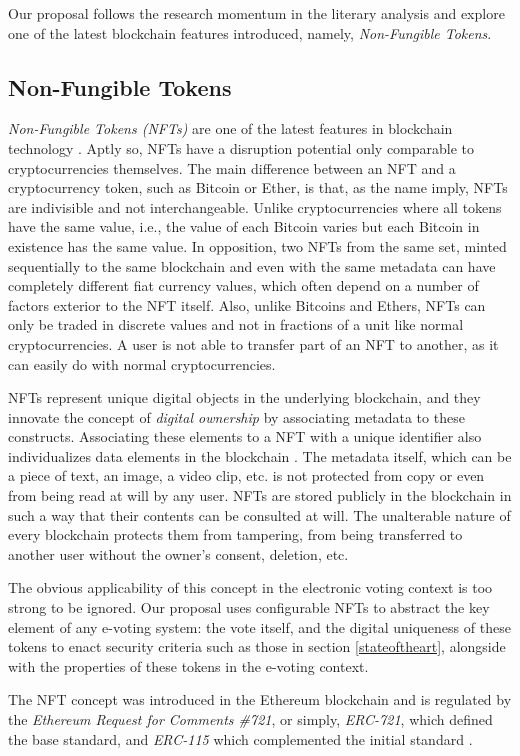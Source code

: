 Our proposal follows the research momentum in the literary analysis and explore one of the latest blockchain features introduced, namely, \textit{Non-Fungible Tokens}.

\subsection{Non-Fungible Tokens}
\textit{Non-Fungible Tokens (NFTs)} are one of the latest features in blockchain technology \cite{Valeonti2021}. Aptly so, NFTs have a disruption potential only comparable to cryptocurrencies themselves. The main difference between an NFT and a cryptocurrency token, such as Bitcoin or Ether, is that, as the name imply, NFTs are indivisible and not interchangeable. Unlike cryptocurrencies where all tokens have the same value, i.e., the value of each Bitcoin varies but each Bitcoin in existence has the same value. In opposition, two NFTs from the same set, minted sequentially to the same blockchain and even with the same metadata can have completely different fiat currency values, which often depend on a number of factors exterior to the NFT itself. Also, unlike Bitcoins and Ethers, NFTs can only be traded in discrete values and not in fractions of a unit like normal cryptocurrencies. A user is not able to transfer part of an NFT to another, as it can easily do with normal cryptocurrencies.
\par
NFTs represent unique digital objects in the underlying blockchain, and they innovate the concept of \textit{digital ownership} by associating metadata to these constructs. Associating these elements to a NFT with a unique identifier also individualizes data elements in the blockchain \cite{Fairfield2021}. The metadata itself, which can be a piece of text, an image, a video clip, etc. is not protected from copy or even from being read at will by any user. NFTs are stored publicly in the blockchain in such a way that their contents can be consulted at will. The unalterable nature of every blockchain protects them from tampering, from being transferred to another user without the owner's consent, deletion, etc.
\par
The obvious applicability of this concept in the electronic voting context is too strong to be ignored. Our proposal uses configurable NFTs to abstract the key element of any e-voting system: the vote itself, and the digital uniqueness of these tokens to enact security criteria such as those in section \ref{stateoftheart}, alongside with the properties of these tokens in the e-voting context.
\par
The NFT concept was introduced in the Ethereum blockchain and is regulated by the \textit{Ethereum Request for Comments \#721}, or simply, \textit{ERC-721}, which defined the base standard, and \textit{ERC-115} which complemented the initial standard \cite{Ali2023}.
\par

